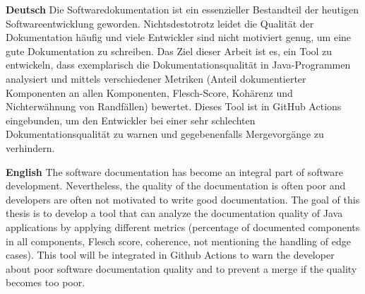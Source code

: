\textbf{Deutsch}
Die Softwaredokumentation ist ein essenzieller Bestandteil der heutigen Softwareentwicklung geworden. Nichtsdestotrotz leidet die Qualität der Dokumentation häufig und viele Entwickler sind nicht motiviert genug, um eine gute Dokumentation zu schreiben. Das Ziel dieser Arbeit ist es, ein Tool zu entwickeln, dass exemplarisch die Dokumentationsqualität in Java-Programmen analysiert und mittels verschiedener Metriken (Anteil dokumentierter Komponenten an allen Komponenten, Flesch-Score, Kohärenz und Nichterwähnung von Randfällen) bewertet. Dieses Tool ist in GitHub Actions eingebunden, um den Entwickler bei einer sehr schlechten Dokumentationsqualität zu warnen und gegebenenfalls Mergevorgänge zu verhindern.

\bigskip

\noindent
\textbf{English} 
The software documentation has become an integral part of software development. Nevertheless, the quality of the documentation is often poor and developers are often not motivated to write good documentation. The goal of this thesis is to develop a tool that can analyze the documentation quality of Java applications by applying different metrics (percentage of documented components in all components, Flesch score, coherence, not mentioning the handling of edge cases). This tool will be integrated in Github Actions to warn the developer about poor software documentation quality and to prevent a merge if the quality becomes too poor.  

